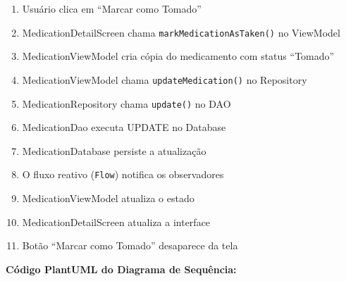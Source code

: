 \documentclass[12pt]{article}
\begin{document}
\begin{enumerate}
    \item Usuário clica em ``Marcar como Tomado''
    \item MedicationDetailScreen chama \texttt{markMedicationAsTaken()} no ViewModel
    \item MedicationViewModel cria cópia do medicamento com status ``Tomado''
    \item MedicationViewModel chama \texttt{updateMedication()} no Repository
    \item MedicationRepository chama \texttt{update()} no DAO
    \item MedicationDao executa UPDATE no Database
    \item MedicationDatabase persiste a atualização
    \item O fluxo reativo (\texttt{Flow}) notifica os observadores
    \item MedicationViewModel atualiza o estado
    \item MedicationDetailScreen atualiza a interface
    \item Botão ``Marcar como Tomado'' desaparece da tela
\end{enumerate}


\textbf{Código PlantUML do Diagrama de Sequência:}
\end{document}

